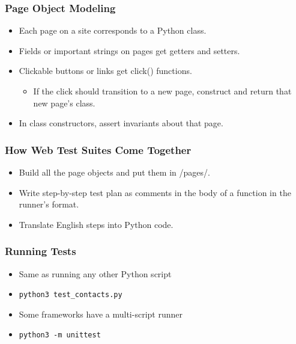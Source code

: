 \begin{frame}
  \frametitle{Page Object Modeling}
  \begin{itemize}
    \item Each page on a site corresponds to a Python class.
    \item Fields or important strings on pages get getters and setters.
    \item Clickable buttons or links get click() functions.
    \begin{itemize}
      \item If the click should transition to a new page, construct and return that new page's class.
    \end{itemize}
    \item In class constructors, assert invariants about that page.
  \end{itemize}
  \citep{kung2000object}
\end{frame}

\begin{frame}
  \frametitle{How Web Test Suites Come Together}
  \begin{itemize}
    \item Build all the page objects and put them in /pages/.
    \item Write step-by-step test plan as comments in the body of a function in the runner's format.
    \item Translate English steps into Python code.
  \end{itemize}
  \citep{nguyen2001testing}
\end{frame}

\begin{frame}
  \frametitle{Running Tests}
  \begin{itemize}
    \item Same as running any other Python script
    \item \texttt{python3 test\_contacts.py} %
    \item Some frameworks have a multi-script runner
    \item \texttt{python3 -m unittest}
  \end{itemize}
\end{frame}
